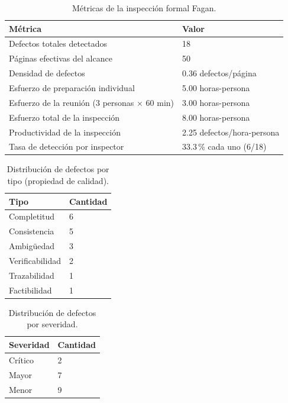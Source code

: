 \documentclass[journal,onecolumn]{IEEEtran}
\begin{document}
	\begin{table}[H]
		\centering
		\caption{Métricas de la inspección formal Fagan.}
		\label{tab:metricas-inspeccion}
		\small
		\begin{tabularx}{\textwidth}{@{}X l@{}}
			\toprule
			\textbf{Métrica} & \textbf{Valor} \\
			\midrule
			Defectos totales detectados & 18 \\
			Páginas efectivas del alcance & 50 \\
			Densidad de defectos & 0.36 defectos/página \\
			Esfuerzo de preparación individual & 5.00 horas-persona \\
			Esfuerzo de la reunión (3 personas $\times$ 60 min) & 3.00 horas-persona \\
			Esfuerzo total de la inspección & 8.00 horas-persona \\
			Productividad de la inspección & 2.25 defectos/hora-persona \\
			Tasa de detección por inspector & 33.3\,\% cada uno (6/18) \\
			\bottomrule
		\end{tabularx}
	\end{table}
	
	\begin{table}[H]
		\centering
		\caption{Distribución de defectos por tipo (propiedad de calidad).}
		\label{tab:distribucion-tipo}
		\small
		\begin{tabularx}{\textwidth}{@{}X l@{}}
			\toprule
			\textbf{Tipo} & \textbf{Cantidad} \\
			\midrule
			Completitud & 6 \\
			Consistencia & 5 \\
			Ambigüedad & 3 \\
			Verificabilidad & 2 \\
			Trazabilidad & 1 \\
			Factibilidad & 1 \\
			\bottomrule
		\end{tabularx}
	\end{table}
	
	\begin{table}[H]
		\centering
		\caption{Distribución de defectos por severidad.}
		\label{tab:distribucion-severidad}
		\small
		\begin{tabularx}{\textwidth}{@{}X l@{}}
			\toprule
			\textbf{Severidad} & \textbf{Cantidad} \\
			\midrule
			Crítico & 2 \\
			Mayor & 7 \\
			Menor & 9 \\
			\bottomrule
		\end{tabularx}
	\end{table}
	
\end{document}
